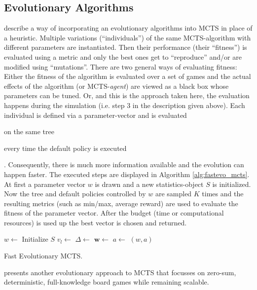 \subsection{Evolutionary Algorithms}
\cite{lucas2014fast} describe a way of incorporating an evolutionary algorithms into  MCTS in place of a heuristic. Multiple variations (\enquote{individuals}) of the same MCTS-algorithm with different parameters are instantiated. Then their performance (their \enquote{fitness}) is evaluated using a metric and only the best ones get to \enquote{reproduce} and/or are modified using \enquote{mutations}. There are two general ways of evaluating fitness: Either the fitness of the algorithm is evaluated over a set of games and the actual effects of the algorithm (or MCTS-\textit{agent}) are viewed as a black box whose parameters can be tuned. Or, and this is the approach taken here, the evaluation happens during the simulation (i.e. step 3 in the description given above). Each individual is defined via a parameter-vector and is evaluated \begin{enumerate*}[label=\alph*)]
    \item on the same tree
    \item every time the default policy is executed 
\end{enumerate*}. Consequently, there is much more information available and the evolution can happen faster. The executed steps are displayed in Algorithm \ref{alg:fastevo_mcts}. At first a parameter vector $w$ is drawn and a new statistics-object $S$ is initialized. Now the tree and default policies controlled by $w$ are sampled $K$ times and the resulting metrics (such as min/max, average reward) are used to evaluate the fitness of the parameter vector. After the budget (time or computational resources) is used up the best vector is chosen and returned.
\begin{algorithm}[htbp]
\begin{algorithmic}
    \State $w \gets$ 
    \State Initialize $S$
    \State $v_l \gets$ 
    \State $\Delta \gets$ 
    \State {}
    \State {}
    \EndFor
    \State {}
    \EndWhile
    \State $\mathbf{w} \gets$ 
    \State $a \gets$ 
    \State \Return $(w,a)$
\EndFunction
\end{algorithmic}
\caption{Fast Evolutionary MCTS.}
\label{alg:fastevo_mcts}
\end{algorithm}

\cite{benbassat2014evomcts} presents another evolutionary approach to MCTS that focusses on zero-sum, deterministic, full-knowledge board games while remaining scalable.